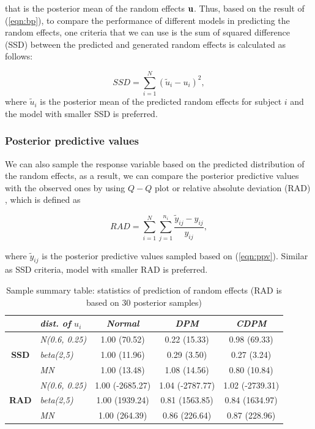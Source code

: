 \documentclass[12pt]{article}
\begin{document}
that is the posterior mean of the random effects ${\bf u}$. Thus, based on the result of (\ref{eqn:bp}), to compare the performance of different models in predicting the random effects,  one criteria that we can use is the sum of squared difference (SSD) between the predicted and generated random effects is calculated as follows:

\begin{equation}\label{eqn:ssd}
SSD=\sum_{i=1}^N (\tilde{u}_i-u_i)^2,
\end{equation}
where $\tilde{u}_i$ is the posterior mean of the predicted random effects for subject $i$ and the model with smaller SSD is preferred.



\subsubsection*{Posterior predictive values}%
We can also sample the response variable based on the predicted distribution of the random effects, as a result, we can compare the posterior predictive values with the observed ones by using $Q-Q$ plot or relative absolute deviation (RAD) \cite{rikhtehgaran2013semi}, which is defined as

\begin{equation}\label{eqn:rad}
RAD = \sum_{i=1}^N\sum_{j=1}^{n_i}\frac{\tilde{y}_{ij}-y_{ij}}{y_{ij}}, 
\end{equation}

where $\tilde{y}_{ij}$ is the posterior predictive values sampled based on (\ref{eqn:ppv}). Similar as SSD criteria, model with smaller RAD is preferred.



\begin{table}[H]
\begin{center}
\caption{Sample summary table: statistics of prediction of random effects (RAD is based on 30 posterior samples)}
\begin{tabular}{clccc}
\hline
 & \emph{dist. of} $u_i$ & \emph{Normal} & \emph{DPM} & \emph{CDPM}\\
\hline
\multirow{3}{*}{\bf SSD} &  \emph{N(0.6, 0.25)} & 1.00 (70.52)& 0.22 (15.33)& 0.98 (69.33) \\
& \emph{beta(2,5)} & 1.00 (11.96)& 0.29 (3.50) & 0.27 (3.24)\\
& \emph{MN} &  1.00 (13.48) & 1.08 (14.56) & 0.80 (10.84)\\
\hline
\multirow{3}{*}{\bf RAD} &  \emph{N(0.6, 0.25)} & 1.00 (-2685.27)&  1.04 (-2787.77)& 1.02 (-2739.31)  \\
& \emph{beta(2,5)} & 1.00 (1939.24)& 0.81 (1563.85) & 0.84 (1634.97)\\
& \emph{MN} & 1.00 (264.39) & 0.86 (226.64)& 0.87 (228.96)\\
\hline
\end{tabular}
\end{center}
\end{table}
\end{document}
